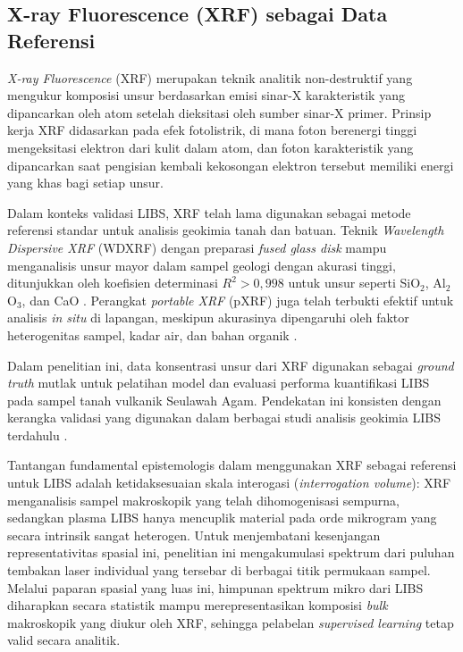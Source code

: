 \subsection{X-ray Fluorescence (XRF) sebagai Data Referensi}

\textit{X-ray Fluorescence} (XRF) merupakan teknik analitik non-destruktif yang mengukur komposisi unsur berdasarkan emisi sinar-X karakteristik yang dipancarkan oleh atom setelah dieksitasi oleh sumber sinar-X primer. Prinsip kerja XRF didasarkan pada efek fotolistrik, di mana foton berenergi tinggi mengeksitasi elektron dari kulit dalam atom, dan foton karakteristik yang dipancarkan saat pengisian kembali kekosongan elektron tersebut memiliki energi yang khas bagi setiap unsur.

Dalam konteks validasi LIBS, XRF telah lama digunakan sebagai metode referensi standar untuk analisis geokimia tanah dan batuan. Teknik \textit{Wavelength Dispersive XRF} (WDXRF) dengan preparasi \textit{fused glass disk} mampu menganalisis unsur mayor dalam sampel geologi dengan akurasi tinggi, ditunjukkan oleh koefisien determinasi $R^2 > 0{,}998$ untuk unsur seperti SiO$_2$, Al$_2$O$_3$, dan CaO \citep{yamasaki_major_2023}. Perangkat \textit{portable XRF} (pXRF) juga telah terbukti efektif untuk analisis \textit{in situ} di lapangan, meskipun akurasinya dipengaruhi oleh faktor heterogenitas sampel, kadar air, dan bahan organik \citep{ravansari_portable_2019}. 

Dalam penelitian ini, data konsentrasi unsur dari XRF digunakan sebagai \textit{ground truth} mutlak untuk pelatihan model dan evaluasi performa kuantifikasi LIBS pada sampel tanah vulkanik Seulawah Agam. Pendekatan ini konsisten dengan kerangka validasi yang digunakan dalam berbagai studi analisis geokimia LIBS terdahulu \citep{khumaeni_analysis_2025, idris_geochemistry_2022}.

Tantangan fundamental epistemologis dalam menggunakan XRF sebagai referensi untuk LIBS adalah ketidaksesuaian skala interogasi (\textit{interrogation volume}): XRF menganalisis sampel makroskopik yang telah dihomogenisasi sempurna, sedangkan plasma LIBS hanya mencuplik material pada orde mikrogram yang secara intrinsik sangat heterogen. Untuk menjembatani kesenjangan representativitas spasial ini, penelitian ini mengakumulasi spektrum dari puluhan tembakan laser individual yang tersebar di berbagai titik permukaan sampel. Melalui paparan spasial yang luas ini, himpunan spektrum mikro dari LIBS diharapkan secara statistik mampu merepresentasikan komposisi \textit{bulk} makroskopik yang diukur oleh XRF, sehingga pelabelan \textit{supervised learning} tetap valid secara analitik.

